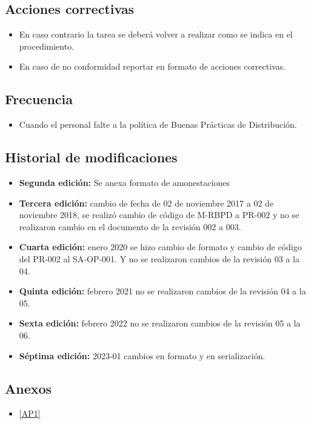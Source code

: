 \subsection{Acciones correctivas}

\begin{itemize}
	\item En caso contrario la tarea se deberá volver a realizar como se indica en el procedimiento.
	\item En caso de no conformidad reportar en formato de acciones correctivas.
\end{itemize}

\subsection{Frecuencia}

\begin{itemize}
	\item Cuando el personal falte a la política de Buenas Prácticas de Distribución.
\end{itemize}

\subsection{Historial de modificaciones}

\begin{itemize}
	\item \textbf{Segunda edición:} Se anexa formato de amonestaciones
	\item \textbf{Tercera edición:} cambio de fecha de 02 de noviembre 2017 a 02 de noviembre 2018, se realizó cambio de código de M-RBPD a PR-002 y no se realizaron cambio en el documento de la revisión 002 a 003.
	\item \textbf{Cuarta edición:} enero 2020 se hizo cambio de formato y cambio de código del PR-002 al SA-OP-001. Y no se realizaron cambios de la revisión 03 a la 04.
	\item \textbf{Quinta edición:} febrero 2021 no se realizaron cambios de la revisión 04 a la 05.
	\item \textbf{Sexta edición:} febrero 2022 no se realizaron cambios de la revisión 05 a la 06.
	\item \textbf{Séptima edición:} 2023-01 cambios en formato y en serialización.
\end{itemize}

\subsection{Anexos}

\begin{itemize}
	\item \cref{AP1}
\end{itemize}
